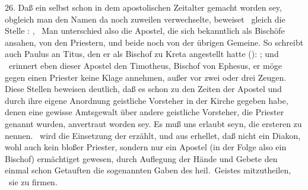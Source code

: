 \begin{aufza}
\item[26.] Daß ein  selbst schon in dem apostolischen Zeitalter gemacht worden sey, obgleich man den Namen da noch zuweilen verwechselte, beweiset \zB\  gleich die Stelle : , \usw\ Man unterschied also die Apostel, die sich bekanntlich als Bischöfe ansahen, von den Priestern, und beide noch von der übrigen Gemeine. So schreibt auch Paulus an Titus, den er als Bischof zu Kreta angestellt hatte (): ; und \ erinnert eben dieser Apostel den Timotheus, Bischof von Ephesus, er möge gegen einen Priester keine Klage annehmen, außer vor zwei oder drei Zeugen. Diese Stellen beweisen deutlich, daß es schon zu den Zeiten der Apostel und durch ihre eigene Anordnung geistliche Vorsteher in der Kirche gegeben habe, denen eine gewisse Amtsgewalt über andere geistliche Vorsteher, die Priester genannt wurden, anvertraut worden sey. Es muß uns erlaubt seyn, die ersteren  zu nennen. \ wird die Einsetzung der  erzählt, und aus  erhellet, daß nicht ein Diakon, wohl auch kein bloßer Priester, sondern nur ein Apostel (in der Folge also ein Bischof) ermächtiget gewesen, durch Auflegung der Hände und Gebete den einmal schon Getauften die sogenannten Gaben des heil.\ Geistes mitzutheilen, \dh\  sie zu firmen. 

\end{aufza}
